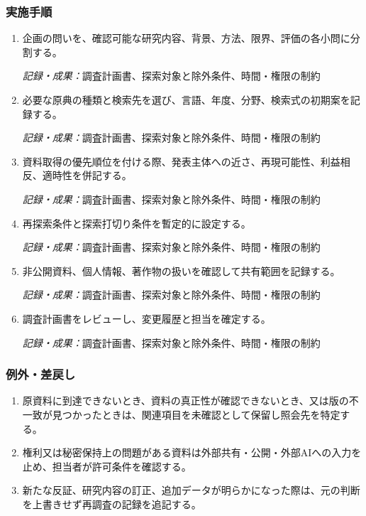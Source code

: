 \documentclass[a4paper,11pt]{article}
\begin{document}
\subsubsection*{実施手順}
\begin{enumerate}[leftmargin=2em,itemsep=0.65em]
\item 企画の問いを、確認可能な研究内容、背景、方法、限界、評価の各小問に分割する。\par\noindent\textit{記録・成果：}調査計画書、探索対象と除外条件、時間・権限の制約\nobreak\smallskip
\item 必要な原典の種類と検索先を選び、言語、年度、分野、検索式の初期案を記録する。\par\noindent\textit{記録・成果：}調査計画書、探索対象と除外条件、時間・権限の制約\nobreak\smallskip
\item 資料取得の優先順位を付ける際、発表主体への近さ、再現可能性、利益相反、適時性を併記する。\par\noindent\textit{記録・成果：}調査計画書、探索対象と除外条件、時間・権限の制約\nobreak\smallskip
\item 再探索条件と探索打切り条件を暫定的に設定する。\par\noindent\textit{記録・成果：}調査計画書、探索対象と除外条件、時間・権限の制約\nobreak\smallskip
\item 非公開資料、個人情報、著作物の扱いを確認して共有範囲を記録する。\par\noindent\textit{記録・成果：}調査計画書、探索対象と除外条件、時間・権限の制約\nobreak\smallskip
\item 調査計画書をレビューし、変更履歴と担当を確定する。\par\noindent\textit{記録・成果：}調査計画書、探索対象と除外条件、時間・権限の制約\nobreak\smallskip
\end{enumerate}
\subsubsection*{例外・差戻し}
\begin{enumerate}[leftmargin=2em,itemsep=0.35em]
\item 原資料に到達できないとき、資料の真正性が確認できないとき、又は版の不一致が見つかったときは、関連項目を未確認として保留し照会先を特定する。
\item 権利又は秘密保持上の問題がある資料は外部共有・公開・外部AIへの入力を止め、担当者が許可条件を確認する。
\item 新たな反証、研究内容の訂正、追加データが明らかになった際は、元の判断を上書きせず再調査の記録を追記する。
\end{enumerate}
\end{document}
